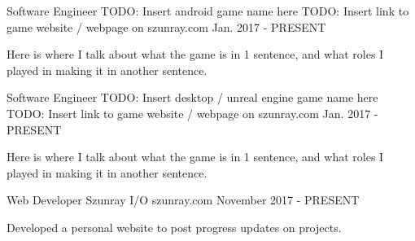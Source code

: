 


\begin{cventries}


\cventry
{Software Engineer} %
{TODO: Insert android game name here} %
{TODO: Insert link to game website / webpage on szunray.com} %
{Jan. 2017 - PRESENT} %
{ %
\begin{cvitems}
\item {Here is where I talk about what the game is in 1 sentence, and what roles I played in making it in another sentence. }
\end{cvitems}
}

\cventry
{Software Engineer} %
{TODO: Insert desktop / unreal engine game name here} %
{TODO: Insert link to game website / webpage on szunray.com} %
{Jan. 2017 - PRESENT} %
{ %
\begin{cvitems}
\item {Here is where I talk about what the game is in 1 sentence, and what roles I played in making it in another sentence. }
\end{cvitems}
}


\cventry
{Web Developer} %
{Szunray I/O} %
{szunray.com} %
{November 2017 - PRESENT} %
{ %
\begin{cvitems}
\item {Developed a personal website to post progress updates on projects.} 
\end{cvitems}
}


\end{cventries}
